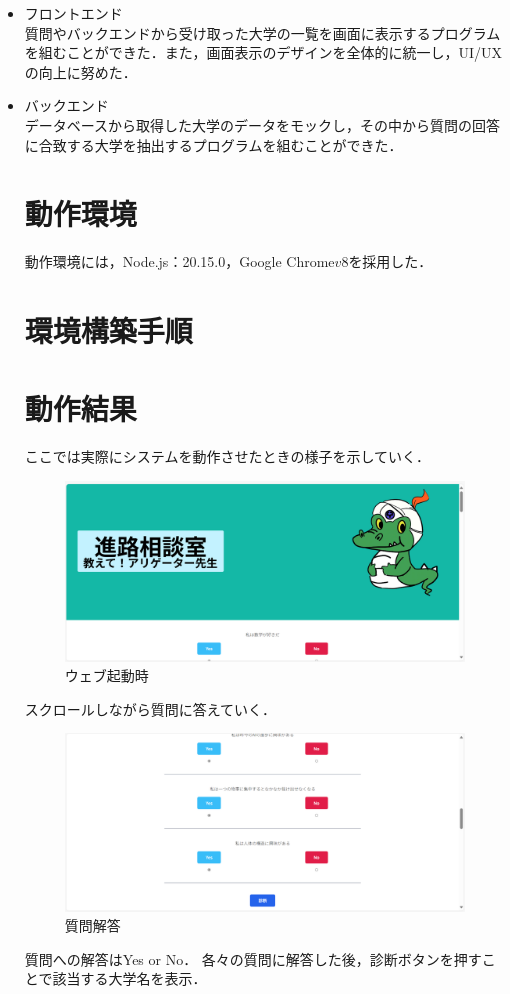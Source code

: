\documentclass[a4j, titlepage]{jarticle}
\begin{document}
\begin{itemize}
\item{フロントエンド} \\
質問やバックエンドから受け取った大学の一覧を画面に表示するプログラムを組むことができた．また，画面表示のデザインを全体的に統一し，UI/UXの向上に努めた．
\item{バックエンド} \\
データベースから取得した大学のデータをモックし，その中から質問の回答に合致する大学を抽出するプログラムを組むことができた．

\section{動作環境}
動作環境には，Node.js：20.15.0，Google Chrome\(v8\)を採用した．
\section{環境構築手順}

\section{動作結果}
ここでは実際にシステムを動作させたときの様子を示していく．
\begin{figure}[h]
\includegraphics{dousakekka-1.png}
\caption{ウェブ起動時}
\end{figure}
スクロールしながら質問に答えていく．

\begin{figure}[h]
\includegraphics{dousakekka-2.png}
\caption{質問解答}
\end{figure}
質問への解答はYes or No．
各々の質問に解答した後，診断ボタンを押すことで該当する大学名を表示．


\end{itemize}
\end{document}

